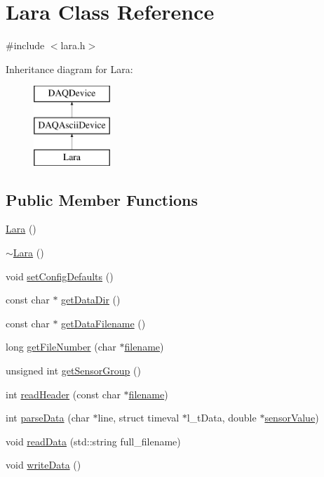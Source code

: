 \hypertarget{classLara}{\section{Lara Class Reference}
\label{classLara}
}


{\ttfamily \#include $<$lara.\-h$>$}

Inheritance diagram for Lara\-:\begin{figure}[H]
\begin{center}
\leavevmode
\includegraphics[height=3.000000cm]{classLara}
\end{center}
\end{figure}
\subsection*{Public Member Functions}
\begin{DoxyCompactItemize}
\item 
\hyperlink{classLara_ad6868223e6c8dcec6297e60cf52c0054}{Lara} ()
\item 
\hyperlink{classLara_a13972df0bdfdfc87b69b8e15f4525296}{$\sim$\-Lara} ()
\item 
void \hyperlink{classLara_aa799138169577ef61f0d43341846ccf9}{set\-Config\-Defaults} ()
\item 
const char $\ast$ \hyperlink{classLara_a717b34c0a592c907ead948e010161ba6}{get\-Data\-Dir} ()
\item 
const char $\ast$ \hyperlink{classLara_a91cc9e1a0ac8f8f13b24bcf966524152}{get\-Data\-Filename} ()
\item 
long \hyperlink{classLara_a6061880b0ad621eb863d14eda0ea0b95}{get\-File\-Number} (char $\ast$\hyperlink{classDAQDevice_a7f9cda7cf5b41f6b134c313477e9644b}{filename})
\item 
unsigned int \hyperlink{classLara_a004ffdd20608ea635775b68733a3d5a3}{get\-Sensor\-Group} ()
\item 
int \hyperlink{classLara_af903264894bc1afa28ea3321deeb7083}{read\-Header} (const char $\ast$\hyperlink{classDAQDevice_a7f9cda7cf5b41f6b134c313477e9644b}{filename})
\item 
int \hyperlink{classLara_aff63ff661248c4aa565282eaba084823}{parse\-Data} (char $\ast$line, struct timeval $\ast$l\-\_\-t\-Data, double $\ast$\hyperlink{classDAQDevice_ad148188c57598fdf4fd4c1c333aeb0d8}{sensor\-Value})
\item 
void \hyperlink{classLara_a727b4aa20f48283239922df33c191de1}{read\-Data} (std\-::string full\-\_\-filename)
\item 
void \hyperlink{classLara_abc32ee9688cef1ec84060d3c206c0123}{write\-Data} ()
\end{DoxyCompactItemize}
